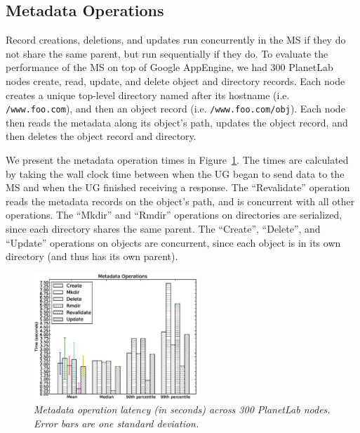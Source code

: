 \subsection{Metadata Operations}


Record creations, deletions, and updates run concurrently in the MS if they do not share the same parent, but run sequentially if they do.  To evaluate the performance of the MS on top of Google AppEngine, we had 300 PlanetLab nodes create, read, update, and delete object and directory records.  Each node creates a unique top-level directory named after its hostname (i.e. \texttt{/www.foo.com}), and then an object record (i.e. \texttt{/www.foo.com/obj}).  Each node then reads the metadata along its object's path, updates the object record, and then deletes the object record and directory.

We present the metadata operation times in Figure~\ref{fig:metadata-latency}.  The times are calculated by taking the wall clock time between when the UG began to send data to the MS and when the UG finished receiving a response.  The ``Revalidate'' operation reads the metadata records on the object's path, and is concurrent with all other operations.  The ``Mkdir'' and ``Rmdir'' operations on directories are serialized, since each directory shares the same parent.  The ``Create'', ``Delete'', and ``Update'' operations on objects are concurrent, since each object is in its own directory (and thus has its own parent).

\begin{figure}[h!]
\centerline{\includegraphics[width=0.55\textwidth]{figures/metadata_operations}}
\label{fig:metadata-latency}
\caption{\it 
Metadata operation latency (in seconds) across 300 PlanetLab nodes.  Error bars are one standard deviation.}
\end{figure}

